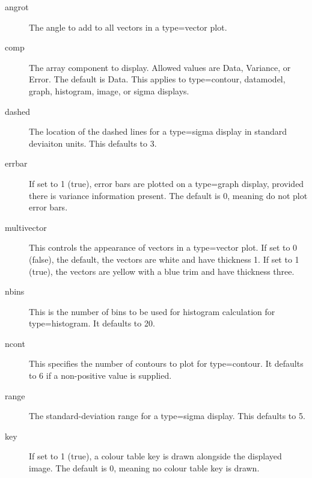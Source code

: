\documentclass[twoside,11pt]{article}
\renewcommand{\_}{\texttt{\symbol{95}}}
\begin{document}
\begin{description}

\item[{angrot}] \mbox{}

The angle to add to all vectors in a type=vector plot.


\item[{comp}] \mbox{}

The array component to display.  Allowed values are Data, Variance, or
Error.  The default is Data.  This applies to type=contour, datamodel,
graph, histogram, image, or sigma displays.


\item[{dashed}] \mbox{}

The location of the dashed lines for a type=sigma display in standard
deviaiton units.  This defaults to 3.


\item[{errbar}] \mbox{}

If set to 1 (true), error bars are plotted on a type=graph display,
provided there is variance information present.  The default is 0,
meaning do not plot error bars.


\item[{multivector}] \mbox{}

This controls the appearance of vectors in a type=vector plot.
If set to 0 (false), the default, the vectors are white and have
thickness 1.  If set to 1 (true), the vectors are yellow with a blue
trim and have thickness three.


\item[{nbins}] \mbox{}

This is the number of bins to be used for histogram calculation for
type=histogram.  It defaults to 20.


\item[{ncont}] \mbox{}

This specifies the number of contours to plot for type=contour.
It defaults to 6 if a non-positive value is supplied.


\item[{range}] \mbox{}

The standard-deviation range for a type=sigma display.  This defaults
to 5.


\item[{key}] \mbox{}

If set to 1 (true), a colour table key is drawn alongside the displayed
image. The default is 0, meaning no colour table key is drawn.

\end{description}
\end{document}
